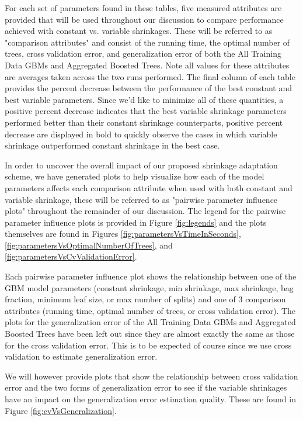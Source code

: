 \documentclass[9pt, conference]{IEEEtran}
\begin{document}
For each set of parameters found in these tables, five measured attributes are provided that will be used throughout our discussion to compare performance achieved with constant vs. variable shrinkages. These will be referred to as "comparison attributes" and consist of the running time, the optimal number of trees, cross validation error, and generalization error of both the All Training Data GBMs and Aggregated Boosted Trees. Note all values for these attributes are averages taken across the two runs performed. The final column of each table provides the percent decrease between the performance of the best constant and best variable parameters. Since we'd like to minimize all of these quantities, a positive percent decrease indicates that the best variable shrinkage parameters performed better than their constant shrinkage counterparts, positive percent decrease are displayed in bold to quickly observe the cases in which variable shrinkage outperformed constant shrinkage in the best case. 

In order to uncover the overall impact of our proposed shrinkage adaptation scheme, we have generated plots to help visualize how each of the model parameters affects each comparison attribute when used with both constant and variable shrinkage, these will be referred to as "pairwise parameter influence plots" throughout the remainder of our discussion. The legend for the pairwise parameter influence plots is provided in Figure \ref{fig:legends} and the plots themselves are found in Figures
\ref{fig:parametersVsTimeInSeconds},
\ref{fig:parametersVsOptimalNumberOfTrees}, and
\ref{fig:parametersVsCvValidationError}.

Each pairwise parameter influence plot shows the relationship between one of the GBM model parameters (constant shrinkage, min shrinkage, max shrinkage, bag fraction, minimum leaf size, or max number of splits) and one of 3 comparison attributes (running time, optimal number of trees, or cross validation error). The plots for the generalization error of the All Training Data GBMs and Aggregated Boosted Trees have been left out since they are almost exactly the same as those for the cross validation error. This is to be expected of course since we use cross validation to estimate generalization error. 

We will however provide plots that show the relationship between cross validation error and the two forms of generalization error to see if the variable shrinkages have an impact on the generalization error estimation quality. These are found in Figure \ref{fig:cvVsGeneralization}.
\end{document}
